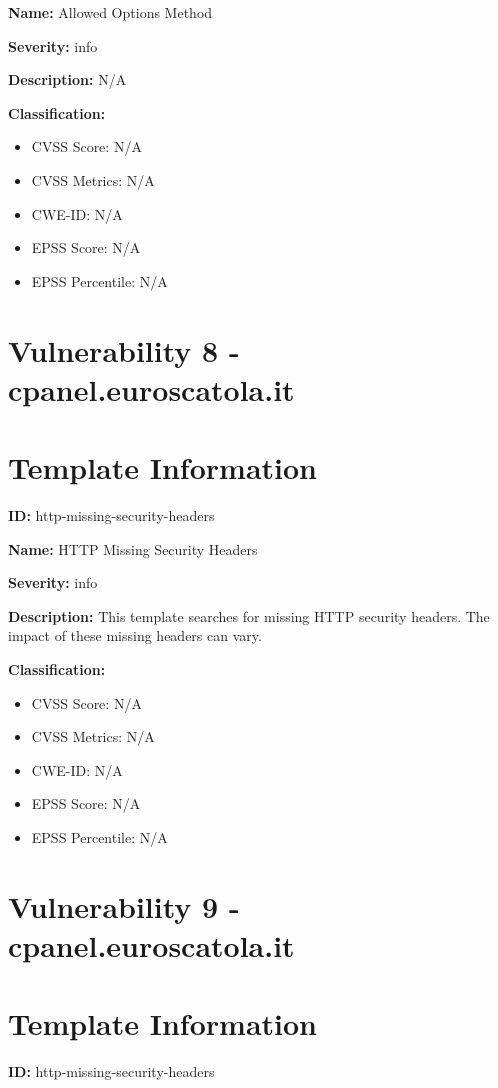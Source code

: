 \textbf{Name:} Allowed Options Method

\textbf{Severity:} info

\textbf{Description:} N/A

\textbf{Classification:}
\begin{itemize}
\item CVSS Score: N/A
\item CVSS Metrics: N/A
\item CWE-ID: N/A
\item EPSS Score: N/A
\item EPSS Percentile: N/A
\end{itemize}



\section*{Vulnerability 8 - cpanel.euroscatola.it}

\section*{Template Information}
\textbf{ID:} http-missing-security-headers

\textbf{Name:} HTTP Missing Security Headers

\textbf{Severity:} info

\textbf{Description:} This template searches for missing HTTP security headers. The impact of these missing headers can vary.


\textbf{Classification:}
\begin{itemize}
\item CVSS Score: N/A
\item CVSS Metrics: N/A
\item CWE-ID: N/A
\item EPSS Score: N/A
\item EPSS Percentile: N/A
\end{itemize}



\section*{Vulnerability 9 - cpanel.euroscatola.it}

\section*{Template Information}
\textbf{ID:} http-missing-security-headers

